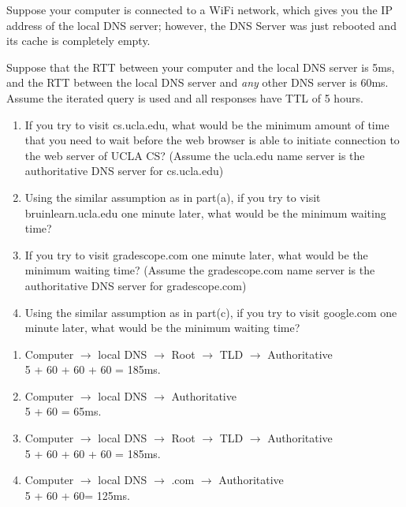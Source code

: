\documentclass{report}
\begin{document}
\newpage

\begin{problem}


Suppose your computer is connected to a WiFi network, which gives you the IP address of the local DNS server; however, the DNS Server was just rebooted and its cache is completely empty.

Suppose that the RTT between your computer and the local DNS server is 5ms, and the RTT between the local DNS server and \textit{any} other DNS server is 60ms.
Assume the iterated query is used and all responses have TTL of 5 hours.

\begin{enumerate}
    \item If you try to visit cs.ucla.edu, what would be the minimum amount of time that you need to wait before the web browser is able to initiate connection to the web server of UCLA CS? (Assume the ucla.edu name server is the authoritative DNS server for cs.ucla.edu)
    \item Using the similar assumption as in part(a), if you try to visit bruinlearn.ucla.edu one minute later, what would be the minimum waiting time?
    \item If you try to visit gradescope.com one minute later, what would be the minimum waiting time? (Assume the gradescope.com name server is the authoritative DNS server for gradescope.com)
    \item Using the similar assumption as in part(c), if you try to visit google.com one minute later, what would be the minimum waiting time? 
\end{enumerate}


\begin{answer}{40em}
  \begin{enumerate}[label=(\alph*)]
  \item Computer $\to$ local DNS $\to$ Root $\to$ TLD $\to$ Authoritative \\
    5 + 60 + 60 + 60 = 185ms.
  \item Computer $\to$ local DNS $\to$ Authoritative \\
    5 + 60 = 65ms.
  \item Computer $\to$ local DNS $\to$ Root $\to$ TLD $\to$ Authoritative \\
    5 + 60 + 60 + 60 = 185ms.
  \item Computer $\to$ local DNS $\to$ .com $\to$ Authoritative \\
    5 + 60 + 60= 125ms.
  \end{enumerate}



\end{answer}
\end{problem}
\end{document}
